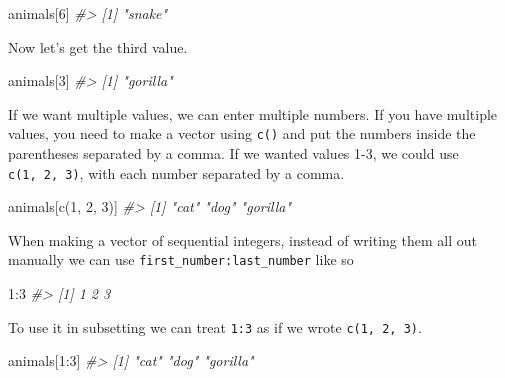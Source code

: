 \documentclass[
]{krantz}
\makeatletter
\newenvironment{Shaded}{\begin{snugshade}}{\end{snugshade}}
\newcommand{\CommentTok}[1]{\textcolor[rgb]{0.37,0.37,0.37}{\textit{#1}}}
\newcommand{\DecValTok}[1]{\textcolor[rgb]{0.06,0.06,0.06}{#1}}
\newcommand{\FunctionTok}[1]{\textcolor[rgb]{0,0,0}{#1}}
\newcommand{\NormalTok}[1]{#1}
\newcommand{\SpecialCharTok}[1]{\textcolor[rgb]{0,0,0}{#1}}
\newenvironment{kframe}{%
\medskip{}
\setlength{\fboxsep}{.8em}
 \def\at@end@of@kframe{}%
 \ifinner\ifhmode%
  \def\at@end@of@kframe{\end{minipage}}%
  \begin{minipage}{\columnwidth}%
 \fi\fi%
 \def\FrameCommand##1{\hskip\@totalleftmargin \hskip-\fboxsep
 \colorbox{shadecolor}{##1}\hskip-\fboxsep
     \hskip-\linewidth \hskip-\@totalleftmargin \hskip\columnwidth}%
 \MakeFramed {\advance\hsize-\width
   \@totalleftmargin\z@ \linewidth\hsize
   \@setminipage}}%
 {\par\unskip\endMakeFramed%
 \at@end@of@kframe}
\renewenvironment{Shaded}{\begin{kframe}}{\end{kframe}}
\makeatother
\begin{document}
\begin{Shaded}
\begin{Highlighting}[]
\NormalTok{animals[}\DecValTok{6}\NormalTok{]}
\CommentTok{\#\textgreater{} [1] "snake"}
\end{Highlighting}
\end{Shaded}

Now let's get the third value.

\begin{Shaded}
\begin{Highlighting}[]
\NormalTok{animals[}\DecValTok{3}\NormalTok{]}
\CommentTok{\#\textgreater{} [1] "gorilla"}
\end{Highlighting}
\end{Shaded}

If we want multiple values, we can enter multiple numbers. If you have multiple values, you need to make a vector using \texttt{c()} and put the numbers inside the parentheses separated by a comma. If we wanted values 1-3, we could use \texttt{c(1,\ 2,\ 3)}, with each number separated by a comma.

\begin{Shaded}
\begin{Highlighting}[]
\NormalTok{animals[}\FunctionTok{c}\NormalTok{(}\DecValTok{1}\NormalTok{, }\DecValTok{2}\NormalTok{, }\DecValTok{3}\NormalTok{)]}
\CommentTok{\#\textgreater{} [1] "cat"     "dog"     "gorilla"}
\end{Highlighting}
\end{Shaded}

When making a vector of sequential integers, instead of writing them all out manually we can use \texttt{first\_number:last\_number} like so

\begin{Shaded}
\begin{Highlighting}[]
\DecValTok{1}\SpecialCharTok{:}\DecValTok{3}
\CommentTok{\#\textgreater{} [1] 1 2 3}
\end{Highlighting}
\end{Shaded}

To use it in subsetting we can treat \texttt{1:3} as if we wrote \texttt{c(1,\ 2,\ 3)}.

\begin{Shaded}
\begin{Highlighting}[]
\NormalTok{animals[}\DecValTok{1}\SpecialCharTok{:}\DecValTok{3}\NormalTok{]}
\CommentTok{\#\textgreater{} [1] "cat"     "dog"     "gorilla"}
\end{Highlighting}
\end{Shaded}
\end{document}
